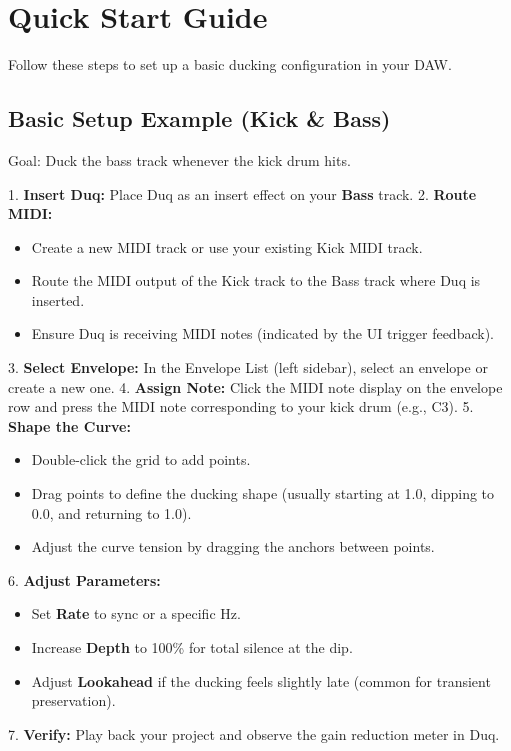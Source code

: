 \chapter{Quick Start Guide}
\label{ch:quick_start}

Follow these steps to set up a basic ducking configuration in your DAW.

\section{Basic Setup Example (Kick \& Bass)}
Goal: Duck the bass track whenever the kick drum hits.

1. \textbf{Insert Duq:} Place Duq as an insert effect on your \textbf{Bass} track.
2. \textbf{Route MIDI:}
   \begin{itemize}
       \item Create a new MIDI track or use your existing Kick MIDI track.
       \item Route the MIDI output of the Kick track to the Bass track where Duq is inserted.
       \item Ensure Duq is receiving MIDI notes (indicated by the UI trigger feedback).
   \end{itemize}
3. \textbf{Select Envelope:} In the Envelope List (left sidebar), select an envelope or create a new one.
4. \textbf{Assign Note:} Click the MIDI note display on the envelope row and press the MIDI note corresponding to your kick drum (e.g., C3).
5. \textbf{Shape the Curve:}
   \begin{itemize}
       \item Double-click the grid to add points.
       \item Drag points to define the ducking shape (usually starting at 1.0, dipping to 0.0, and returning to 1.0).
       \item Adjust the curve tension by dragging the anchors between points.
   \end{itemize}
6. \textbf{Adjust Parameters:}
   \begin{itemize}
       \item Set \textbf{Rate} to sync or a specific Hz.
       \item Increase \textbf{Depth} to 100\% for total silence at the dip.
       \item Adjust \textbf{Lookahead} if the ducking feels slightly late (common for transient preservation).
   \end{itemize}
7. \textbf{Verify:} Play back your project and observe the gain reduction meter in Duq.
